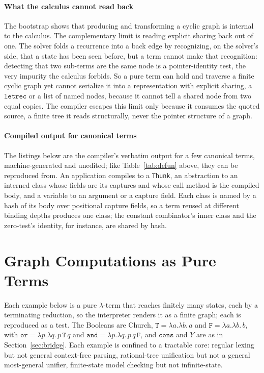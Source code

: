 \paragraph{What the calculus cannot read back}
The bootstrap shows that producing and transforming a cyclic graph is internal to the calculus. The complementary limit is reading explicit sharing back out of one. The solver folds a recurrence into a back edge by recognizing, on the solver's side, that a state has been seen before, but a term cannot make that recognition: detecting that two sub-terms are the same node is a pointer-identity test, the very impurity the calculus forbids. So a pure term can hold and traverse a finite cyclic graph yet cannot serialize it into a representation with explicit sharing, a $\mathtt{letrec}$ or a list of named nodes, because it cannot tell a shared node from two equal copies. The compiler escapes this limit only because it consumes the quoted source, a finite tree it reads structurally, never the pointer structure of a graph.

\paragraph{Compiled output for canonical terms}\label{app:compiler-examples}
The listings below are the compiler's verbatim output for a few canonical terms, machine-generated and unedited; like Table~\ref{tab:defun} above, they can be reproduced from. An application compiles to a \texttt{Thunk}, an abstraction to an interned class whose fields are its captures and whose call method is the compiled body, and a variable to an argument or a capture field. Each class is named by a hash of its body over positional capture fields, so a term reused at different binding depths produces one class; the constant combinator's inner class and the zero-test's identity, for instance, are shared by hash.



\section{Graph Computations as Pure Terms}\label{app:dsl}
Each example below is a pure $\lambda$-term that reaches finitely many states, each by a terminating reduction, so the interpreter renders it as a finite graph; each is reproduced as a test. The Booleans are Church, $\mathtt{T} = \lambda a.\lambda b.\,a$ and $\mathtt{F} = \lambda a.\lambda b.\,b$, with $\mathtt{or} = \lambda p.\lambda q.\,p\,\mathtt{T}\,q$ and $\mathtt{and} = \lambda p.\lambda q.\,p\,q\,\mathtt{F}$, and $\mathtt{cons}$ and $Y$ are as in Section~\ref{sec:bridge}. Each example is confined to a tractable core: regular lexing but not general context-free parsing, rational-tree unification but not a general most-general unifier, finite-state model checking but not infinite-state.

